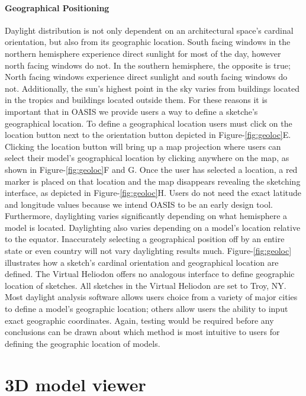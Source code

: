 \paragraph{Geographical Positioning}
Daylight distribution is  not only dependent on an architectural space's cardinal orientation, but also from its geographic location.  South facing windows in the northern hemisphere experience direct sunlight for most of the day, however north facing windows do not.  In the southern hemisphere, the opposite is true; North facing windows experience direct sunlight and south facing windows do not.  Additionally, the sun's highest point in the sky varies from buildings located in the tropics and buildings located outside them.  For these reasons it is important that in OASIS we provide users a way to define a sketche's geographical location.  To define a geographical location users must click on the location button next to the orientation button depicted in Figure-\ref{fig:geoloc}E.  Clicking the location button will bring up a map projection where users can select their model's geographical location by clicking anywhere on the map, as shown in Figure-\ref{fig:geoloc}F and G.  Once the user has selected a location, a red marker is placed on that location and the map  disappears revealing the sketching interface, as depicted in Figure-\ref{fig:geoloc}H.  Users do not need the exact latitude and longitude values because we intend OASIS to be an early design tool.  Furthermore, daylighting varies significantly depending on what hemisphere a model is located. Daylighting also varies depending on a model's location relative to the equator.  Inaccurately selecting a geographical position off by an entire state or even country will not vary daylighting results much.  Figure-\ref{fig:geoloc} illustrates how a sketch's cardinal orientation and geographical location are defined.  The Virtual Heliodon offers no analogous interface to define geographic location of sketches.  All sketches in the Virtual Heliodon are set to Troy, NY.  Most daylight analysis software allows users choice from a variety of major cities to define a model's geographic location; others allow users the ability to input exact geographic coordinates.  Again, testing would be required before any conclusions can be drawn about which method is most intuitive to users for defining the geographic location of models.\\ 

\section{3D model viewer}

